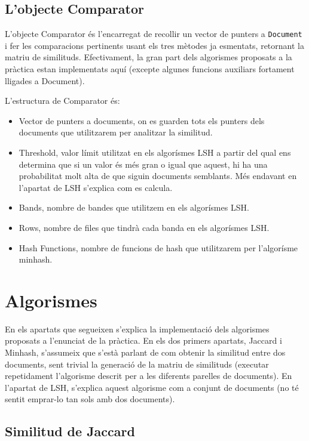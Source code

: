 \documentclass[catalan, 12pt]{report}
\begin{document}
\subsection{L'objecte Comparator}

L'objecte Comparator és l'encarregat de recollir un vector de punters a \verb|Document| i fer les comparacions pertinents usant els tres mètodes ja esmentats, retornant la matriu de similituds. Efectivament, la gran part dels algorismes proposats a la pràctica estan implementats aquí (excepte algunes funcions auxiliars fortament lligades a Document).\newline

L'estructura de Comparator és:

\begin{itemize}
\item Vector de punters a documents, on es guarden tots els punters dels documents que utilitzarem per analitzar la similitud.
\item Threshold, valor límit utilitzat en els algorísmes LSH a partir del qual ens determina que si un valor és més gran o igual que aquest, hi ha una probabilitat molt alta de que siguin documents semblants. Més endavant en l'apartat de LSH s'explica com es calcula.
\item Bands, nombre de bandes que utilitzem en els algorísmes LSH. 
\item Rows, nombre de files que tindrà cada banda en els algorísmes LSH.
\item Hash Functions, nombre de funcions de hash que utilitzarem per l'algorísme minhash.
\end{itemize}

\section{Algorismes}

En els apartats que segueixen s'explica la implementació dels algorismes proposats a l'enunciat de la pràctica. En els dos primers apartats, Jaccard i Minhash, s'assumeix que s'està parlant de com obtenir la similitud entre dos documents, sent trivial la generació de la matriu de similituds (executar repetidament l'algorisme descrit per a les diferents parelles de documents). En l'apartat de LSH, s'explica aquest algorisme com a conjunt de documents (no té sentit emprar-lo tan sols amb dos documents).

\subsection{Similitud de Jaccard}
\end{document}
